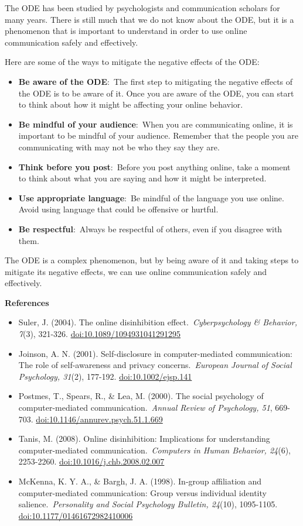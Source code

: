\documentclass[
  b5paper]{book}
\begin{document}
The ODE has been studied by psychologists and communication scholars for many years. There is still much that we do not know about the ODE, but it is a phenomenon that is important to understand in order to use online communication safely and effectively.

Here are some of the ways to mitigate the negative effects of the ODE:

\begin{itemize}
\item
  \textbf{Be aware of the ODE}:~The first step to mitigating the negative effects of the ODE is to be aware of it. Once you are aware of the ODE, you can start to think about how it might be affecting your online behavior.
\item
  \textbf{Be mindful of your audience}:~When you are communicating online, it is important to be mindful of your audience. Remember that the people you are communicating with may not be who they say they are.
\item
  \textbf{Think before you post}:~Before you post anything online, take a moment to think about what you are saying and how it might be interpreted.
\item
  \textbf{Use appropriate language}:~Be mindful of the language you use online. Avoid using language that could be offensive or hurtful.
\item
  \textbf{Be respectful}:~Always be respectful of others, even if you disagree with them.
\end{itemize}

The ODE is a complex phenomenon, but by being aware of it and taking steps to mitigate its negative effects, we can use online communication safely and effectively.

\textbf{References}

\begin{itemize}
\item
  Suler, J. (2004). The online disinhibition effect.~\emph{Cyberpsychology \& Behavior, 7}(3), 321-326. \url{doi:10.1089/1094931041291295}
\item
  Joinson, A. N. (2001). Self-disclosure in computer-mediated communication: The role of self-awareness and privacy concerns.~\emph{European Journal of Social Psychology, 31}(2), 177-192. \url{doi:10.1002/ejsp.141}
\item
  Postmes, T., Spears, R., \& Lea, M. (2000). The social psychology of computer-mediated communication.~\emph{Annual Review of Psychology, 51}, 669-703. \url{doi:10.1146/annurev.psych.51.1.669}
\item
  Tanis, M. (2008). Online disinhibition: Implications for understanding computer-mediated communication.~\emph{Computers in Human Behavior, 24}(6), 2253-2260. \url{doi:10.1016/j.chb.2008.02.007}
\item
  McKenna, K. Y. A., \& Bargh, J. A. (1998). In-group affiliation and computer-mediated communication: Group versus individual identity salience.~\emph{Personality and Social Psychology Bulletin, 24}(10), 1095-1105. \url{doi:10.1177/01461672982410006}
\end{itemize}
\end{document}
